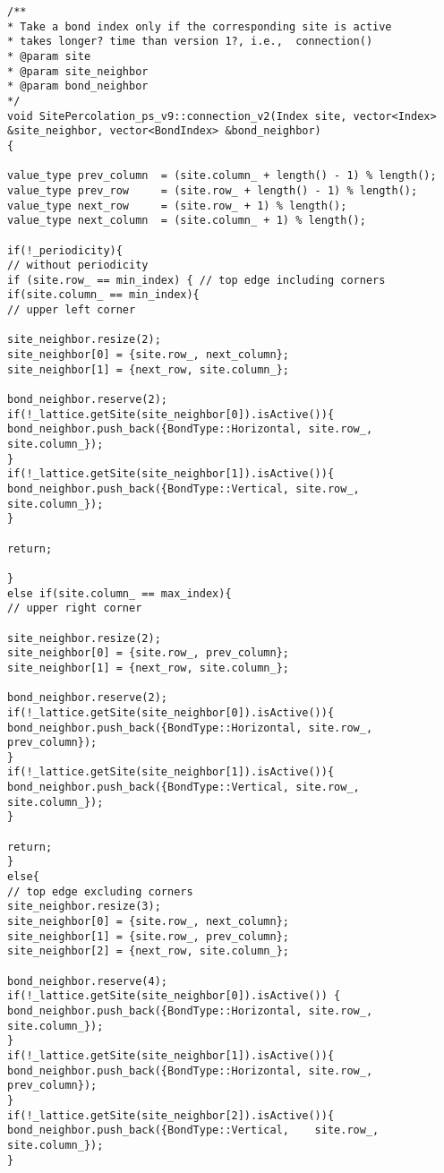 \begin{lstlisting}[style=CStyle]
/**
* Take a bond index only if the corresponding site is active
* takes longer? time than version 1?, i.e.,  connection()
* @param site
* @param site_neighbor
* @param bond_neighbor
*/
void SitePercolation_ps_v9::connection_v2(Index site, vector<Index> &site_neighbor, vector<BondIndex> &bond_neighbor)
{

value_type prev_column  = (site.column_ + length() - 1) % length();
value_type prev_row     = (site.row_ + length() - 1) % length();
value_type next_row     = (site.row_ + 1) % length();
value_type next_column  = (site.column_ + 1) % length();

if(!_periodicity){
// without periodicity
if (site.row_ == min_index) { // top edge including corners
if(site.column_ == min_index){
// upper left corner

site_neighbor.resize(2);
site_neighbor[0] = {site.row_, next_column};
site_neighbor[1] = {next_row, site.column_};

bond_neighbor.reserve(2);
if(!_lattice.getSite(site_neighbor[0]).isActive()){
bond_neighbor.push_back({BondType::Horizontal, site.row_, site.column_});
}
if(!_lattice.getSite(site_neighbor[1]).isActive()){
bond_neighbor.push_back({BondType::Vertical, site.row_, site.column_});
}

return;

}
else if(site.column_ == max_index){
// upper right corner

site_neighbor.resize(2);
site_neighbor[0] = {site.row_, prev_column};
site_neighbor[1] = {next_row, site.column_};

bond_neighbor.reserve(2);
if(!_lattice.getSite(site_neighbor[0]).isActive()){
bond_neighbor.push_back({BondType::Horizontal, site.row_, prev_column});
}
if(!_lattice.getSite(site_neighbor[1]).isActive()){
bond_neighbor.push_back({BondType::Vertical, site.row_, site.column_});
}

return;
}
else{
// top edge excluding corners
site_neighbor.resize(3);
site_neighbor[0] = {site.row_, next_column};
site_neighbor[1] = {site.row_, prev_column};
site_neighbor[2] = {next_row, site.column_};

bond_neighbor.reserve(4);
if(!_lattice.getSite(site_neighbor[0]).isActive()) {
bond_neighbor.push_back({BondType::Horizontal, site.row_, site.column_});
}
if(!_lattice.getSite(site_neighbor[1]).isActive()){
bond_neighbor.push_back({BondType::Horizontal, site.row_, prev_column});
}
if(!_lattice.getSite(site_neighbor[2]).isActive()){
bond_neighbor.push_back({BondType::Vertical,    site.row_, site.column_});
}


\end{lstlisting}
